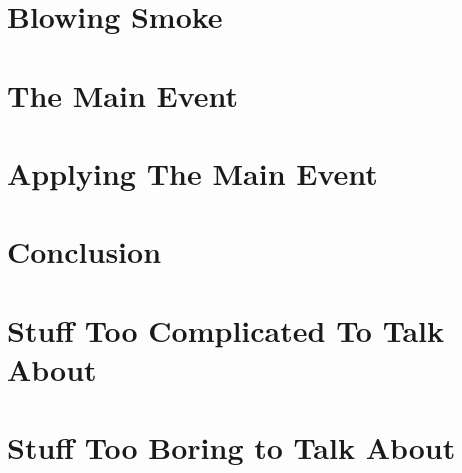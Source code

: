 \documentclass[12pt]{report}   %
\begin{document}
%
\clearpage{\pagestyle{empty}\cleardoublepage}

\chapter{Blowing Smoke}
%
\clearpage{\pagestyle{empty}\cleardoublepage}

\chapter{The Main Event}
%
\clearpage{\pagestyle{empty}\cleardoublepage}

\chapter{Applying The Main Event}
%
\clearpage{\pagestyle{empty}\cleardoublepage}

\chapter{Conclusion}
%
\clearpage{\pagestyle{empty}\cleardoublepage}

\appendix
\chapter{Stuff Too Complicated To Talk About}
%
\clearpage{\pagestyle{empty}\cleardoublepage}

\chapter{Stuff Too Boring to Talk About}
%
\clearpage{\pagestyle{empty}\cleardoublepage}



\begin{spacing}{0.9}
  
\end{spacing}
\end{document}
